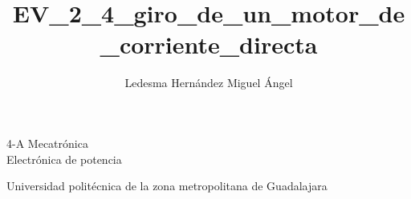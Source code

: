 \documentclass[letterpaper]{article}
\title{EV\_2\_4\_giro\_de\_un\_motor\_de\_corriente\_directa}
\author{Ledesma Hernández Miguel Ángel}
\begin{document}
\maketitle
\vspace{10cm}
\begin{center}
4-A Mecatrónica\\
Electrónica de potencia \\
\end{center}


\vspace{3cm}
\begin{center}
Universidad politécnica de la zona metropolitana de Guadalajara\\
\end{center}





\newpage
\end{document}
